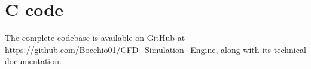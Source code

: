 \documentclass{assignment}
\begin{document}
\clearpage
\section{C code}
The complete codebase is available on GitHub at \url{https://github.com/Bocchio01/CFD_Simulation_Engine}, along with its technical documentation.








\end{document}
